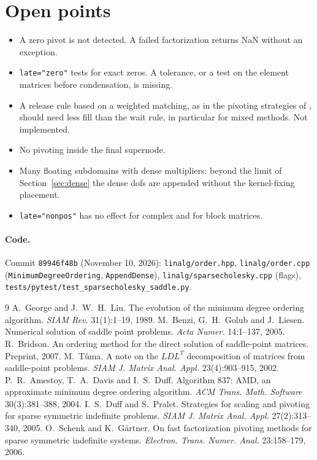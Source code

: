 \documentclass[10pt,a4paper]{article}
\newcommand{\code}[1]{\texttt{#1}}
\begin{document}
\section{Open points}
\begin{itemize}\setlength\itemsep{1pt}
\item A zero pivot is not detected. A failed factorization returns NaN without an exception.
\item \code{late="zero"} tests for exact zeros. A tolerance, or a test on the element matrices before condensation, is missing.
\item A release rule based on a weighted matching, as in the pivoting strategies of \cite{dp05,sg06}, should need less fill than the wait rule, in particular for mixed methods. Not implemented.
\item No pivoting inside the final supernode.
\item Many floating subdomains with dense multipliers: beyond the limit of Section~\ref{sec:dense} the dense dofs are appended without the kernel-fixing placement.
\item \code{late="nonpos"} has no effect for complex and for block matrices.
\end{itemize}

\paragraph{Code.} Commit \code{89946f48b} (November 10, 2026): \code{linalg/order.hpp}, \code{linalg/order.cpp} (\code{MinimumDegreeOrdering}, \code{AppendDense}), \code{linalg/sparsecholesky.cpp} (flags), \code{tests/pytest/test\_sparsecholesky\_saddle.py}.

{\footnotesize\setlength{\itemsep}{0pt}
\begin{thebibliography}{9}\setlength{\itemsep}{1pt}
 A.~George and J.~W.~H.~Liu. The evolution of the minimum degree ordering algorithm. \emph{SIAM Rev.} 31(1):1--19, 1989.
 M.~Benzi, G.~H.~Golub and J.~Liesen. Numerical solution of saddle point problems. \emph{Acta Numer.} 14:1--137, 2005.
 R.~Bridson. An ordering method for the direct solution of saddle-point matrices. Preprint, 2007.
 M.~T\r{u}ma. A note on the $LDL^T$ decomposition of matrices from saddle-point problems. \emph{SIAM J. Matrix Anal. Appl.} 23(4):903--915, 2002.
 P.~R.~Amestoy, T.~A.~Davis and I.~S.~Duff. Algorithm 837: AMD, an approximate minimum degree ordering algorithm. \emph{ACM Trans. Math. Software} 30(3):381--388, 2004.
 I.~S.~Duff and S.~Pralet. Strategies for scaling and pivoting for sparse symmetric indefinite problems. \emph{SIAM J. Matrix Anal. Appl.} 27(2):313--340, 2005.
 O.~Schenk and K.~G\"artner. On fast factorization pivoting methods for sparse symmetric indefinite systems. \emph{Electron. Trans. Numer. Anal.} 23:158--179, 2006.
\end{thebibliography}}
\end{document}
